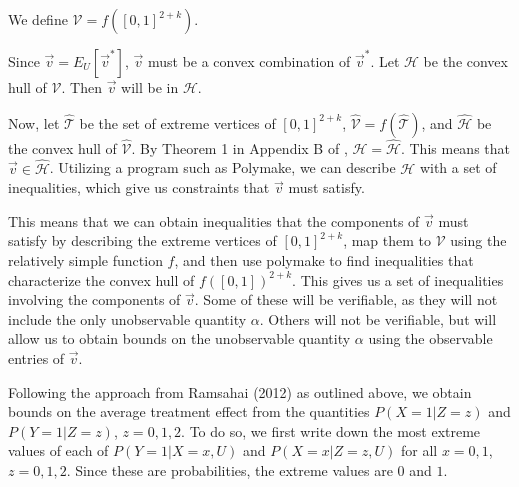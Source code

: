 \documentclass[
]{article}
\theoremstyle{plain}
\begin{document}
We define \(\mathcal{V} = f([0,1]^{2+k})\).

Since \(\vec{v} = E_U[\vec{v}^*]\), \(\vec{v}\) must be a convex combination of \(\vec{v}^*\). Let \(\mathcal{H}\) be the convex hull of \(\mathcal{V}\). Then \(\vec{v}\) will be in \(\mathcal{H}\).

Now, let \(\hat{\mathcal{T}}\) be the set of extreme vertices of \([0,1]^{2+k}\), \(\hat{\mathcal{V}} = f(\hat{\mathcal{T}})\), and \(\hat{\mathcal{H}}\) be the convex hull of \(\hat{\mathcal{V}}\). By Theorem 1 in Appendix B of \textcite{ramsahai_causal_2012}, \(\mathcal{H} = \mathcal{\hat{H}}\). This means that \(\vec{v} \in \mathcal{\hat{H}}\). Utilizing a program such as Polymake, we can describe \(\mathcal{H}\) with a set of inequalities, which give us constraints that \(\vec{v}\) must satisfy.

This means that we can obtain inequalities that the components of \(\vec{v}\) must satisfy by describing the extreme vertices of \([0,1]^{2+k}\), map them to \(\mathcal{V}\) using the relatively simple function \(f\), and then use polymake to find inequalities that characterize the convex hull of \(f([0,1])^{2+k}\). This gives us a set of inequalities involving the components of \(\vec{v}\). Some of these will be verifiable, as they will not include the only unobservable quantity \(\alpha\). Others will not be verifiable, but will allow us to obtain bounds on the unobservable quantity \(\alpha\) using the observable entries of \(\vec{v}\).

Following the approach from Ramsahai (2012) as outlined above, we obtain bounds on the average treatment effect from the quantities \(P(X = 1 | Z = z)\) and \(P(Y = 1 | Z = z)\), \(z = 0,1,2\). To do so, we first write down the most extreme values of each of \(P(Y = 1 | X = x, U)\) and \(P(X = x | Z = z, U)\) for all \(x=0,1\), \(z=0,1,2\). Since these are probabilities, the extreme values are \(0\) and \(1\).
\end{document}
